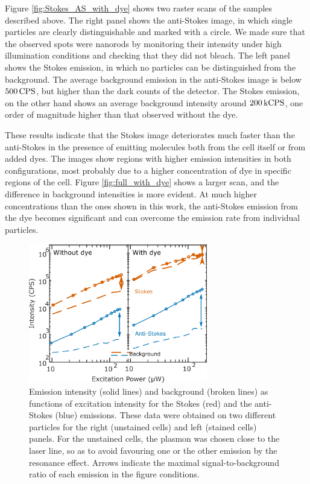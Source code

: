 Figure \ref{fig:Stokes_AS_with_dye} shows two raster scans of the samples
described above. The right panel shows the anti-Stokes image, in which single
particles are clearly distinguishable and marked with a circle. We made sure
that the observed spots were nanorods by monitoring their intensity under high
illumination conditions and checking that they did not bleach. The left panel
shows the Stokes emission, in which no particles can be distinguished from the
background. The average background emission in the anti-Stokes image is
below $500\,\textrm{CPS}$, but higher than the dark counts of the detector. The Stokes
emission, on the other hand shows an average background intensity
around $200\,\textrm{kCPS}$, one order of magnitude higher than that observed without the
dye.

These results indicate that the Stokes image deteriorates much faster than the
anti-Stokes in the presence of emitting molecules both from the cell itself or
from added dyes. The images show regions with higher emission intensities in
both configurations, most probably due to a higher concentration of dye in
specific regions of the cell. Figure \ref{fig:full_with_dye} shows a larger
scan, and the difference in background intensities is more evident. At much
higher concentrations than the ones shown in this work, the anti-Stokes emission
from the dye becomes significant and can overcome the emission rate from
individual particles.

\begin{figure}[tp] \centering
\includegraphics[width=7.8cm]{Chapters/03_Background_Free/Figures/06_Power_Intensity/power_intensity.png}
\caption{Emission intensity (solid lines) and background (broken lines) as
functions of excitation intensity for the Stokes (red) and the anti-Stokes
(blue) emissions. These data were obtained on two different particles for the
right (unstained cells) and left (stained cells) panels. For the unstained
cells, the plasmon was chosen close to the laser line, so as to avoid favouring
one or the other emission by the resonance effect. Arrows indicate the maximal
signal-to-background ratio of each emission in the figure conditions. }
	\label{fig:power_intensity}
\end{figure}

